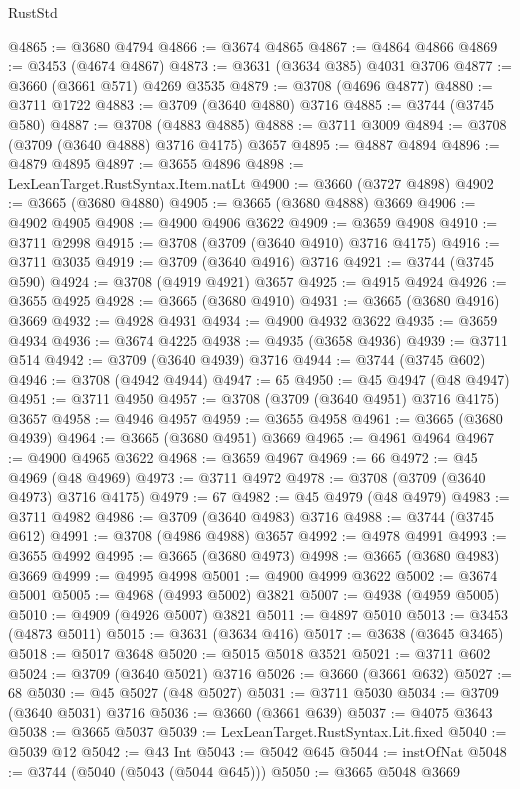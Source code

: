 \begin{lexlean}{RustStd}
\begin{coremodule}
@4865 := @3680 @4794
@4866 := @3674 @4865
@4867 := @4864 @4866
@4869 := @3453 (@4674 @4867)
@4873 := @3631 (@3634 @385) @4031 @3706
@4877 := @3660 (@3661 @571) @4269 @3535
@4879 := @3708 (@4696 @4877)
@4880 := @3711 @1722
@4883 := @3709 (@3640 @4880) @3716
@4885 := @3744 (@3745 @580)
@4887 := @3708 (@4883 @4885)
@4888 := @3711 @3009
@4894 := @3708 (@3709 (@3640 @4888) @3716 @4175) @3657
@4895 := @4887 @4894
@4896 := @4879 @4895
@4897 := @3655 @4896
@4898 := LexLeanTarget.RustSyntax.Item.natLt
@4900 := @3660 (@3727 @4898)
@4902 := @3665 (@3680 @4880)
@4905 := @3665 (@3680 @4888) @3669
@4906 := @4902 @4905
@4908 := @4900 @4906 @3622
@4909 := @3659 @4908
@4910 := @3711 @2998
@4915 := @3708 (@3709 (@3640 @4910) @3716 @4175)
@4916 := @3711 @3035
@4919 := @3709 (@3640 @4916) @3716
@4921 := @3744 (@3745 @590)
@4924 := @3708 (@4919 @4921) @3657
@4925 := @4915 @4924
@4926 := @3655 @4925
@4928 := @3665 (@3680 @4910)
@4931 := @3665 (@3680 @4916) @3669
@4932 := @4928 @4931
@4934 := @4900 @4932 @3622
@4935 := @3659 @4934
@4936 := @3674 @4225
@4938 := @4935 (@3658 @4936)
@4939 := @3711 @514
@4942 := @3709 (@3640 @4939) @3716
@4944 := @3744 (@3745 @602)
@4946 := @3708 (@4942 @4944)
@4947 := 65
@4950 := @45 @4947 (@48 @4947)
@4951 := @3711 @4950
@4957 := @3708 (@3709 (@3640 @4951) @3716 @4175) @3657
@4958 := @4946 @4957
@4959 := @3655 @4958
@4961 := @3665 (@3680 @4939)
@4964 := @3665 (@3680 @4951) @3669
@4965 := @4961 @4964
@4967 := @4900 @4965 @3622
@4968 := @3659 @4967
@4969 := 66
@4972 := @45 @4969 (@48 @4969)
@4973 := @3711 @4972
@4978 := @3708 (@3709 (@3640 @4973) @3716 @4175)
@4979 := 67
@4982 := @45 @4979 (@48 @4979)
@4983 := @3711 @4982
@4986 := @3709 (@3640 @4983) @3716
@4988 := @3744 (@3745 @612)
@4991 := @3708 (@4986 @4988) @3657
@4992 := @4978 @4991
@4993 := @3655 @4992
@4995 := @3665 (@3680 @4973)
@4998 := @3665 (@3680 @4983) @3669
@4999 := @4995 @4998
@5001 := @4900 @4999 @3622
@5002 := @3674 @5001
@5005 := @4968 (@4993 @5002) @3821
@5007 := @4938 (@4959 @5005)
@5010 := @4909 (@4926 @5007) @3821
@5011 := @4897 @5010
@5013 := @3453 (@4873 @5011)
@5015 := @3631 (@3634 @416)
@5017 := @3638 (@3645 @3465)
@5018 := @5017 @3648
@5020 := @5015 @5018 @3521
@5021 := @3711 @602
@5024 := @3709 (@3640 @5021) @3716
@5026 := @3660 (@3661 @632)
@5027 := 68
@5030 := @45 @5027 (@48 @5027)
@5031 := @3711 @5030
@5034 := @3709 (@3640 @5031) @3716
@5036 := @3660 (@3661 @639)
@5037 := @4075 @3643
@5038 := @3665 @5037
@5039 := LexLeanTarget.RustSyntax.Lit.fixed
@5040 := @5039 @12
@5042 := @43 Int
@5043 := @5042 @645
@5044 := instOfNat
@5048 := @3744 (@5040 (@5043 (@5044 @645)))
@5050 := @3665 @5048 @3669

\end{coremodule}
\end{lexlean}
